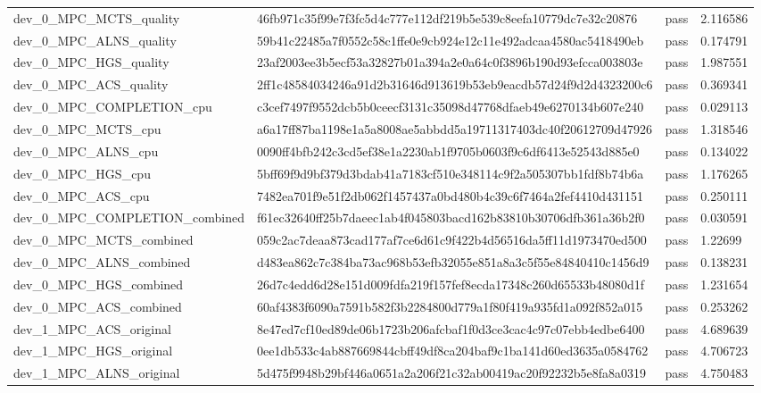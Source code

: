 \begin{tabular}{llll}
dev\_0\_MPC\_MCTS\_quality & 46fb971c35f99e7f3fc5d4c777e112df219b5e539c8eefa10779dc7e32c20876 & pass & 2.116586 \\
dev\_0\_MPC\_ALNS\_quality & 59b41c22485a7f0552c58c1ffe0e9cb924e12c11e492adcaa4580ac5418490eb & pass & 0.174791 \\
dev\_0\_MPC\_HGS\_quality & 23af2003ee3b5ecf53a32827b01a394a2e0a64c0f3896b190d93efcca003803e & pass & 1.987551 \\
dev\_0\_MPC\_ACS\_quality & 2ff1c48584034246a91d2b31646d913619b53eb9eacdb57d24f9d2d4323200c6 & pass & 0.369341 \\
dev\_0\_MPC\_COMPLETION\_cpu & c3cef7497f9552dcb5b0ceecf3131c35098d47768dfaeb49e6270134b607e240 & pass & 0.029113 \\
dev\_0\_MPC\_MCTS\_cpu & a6a17ff87ba1198e1a5a8008ae5abbdd5a19711317403dc40f20612709d47926 & pass & 1.318546 \\
dev\_0\_MPC\_ALNS\_cpu & 0090ff4bfb242c3cd5ef38e1a2230ab1f9705b0603f9c6df6413e52543d885e0 & pass & 0.134022 \\
dev\_0\_MPC\_HGS\_cpu & 5bff69f9d9bf379d3bdab41a7183cf510e348114c9f2a505307bb1fdf8b74b6a & pass & 1.176265 \\
dev\_0\_MPC\_ACS\_cpu & 7482ea701f9e51f2db062f1457437a0bd480b4c39c6f7464a2fef4410d431151 & pass & 0.250111 \\
dev\_0\_MPC\_COMPLETION\_combined & f61ec32640ff25b7daeec1ab4f045803bacd162b83810b30706dfb361a36b2f0 & pass & 0.030591 \\
dev\_0\_MPC\_MCTS\_combined & 059c2ac7deaa873cad177af7ce6d61c9f422b4d56516da5ff11d1973470ed500 & pass & 1.22699 \\
dev\_0\_MPC\_ALNS\_combined & d483ea862c7c384ba73ac968b53efb32055e851a8a3c5f55e84840410c1456d9 & pass & 0.138231 \\
dev\_0\_MPC\_HGS\_combined & 26d7c4edd6d28e151d009fdfa219f157fef8ecda17348c260d65533b48080d1f & pass & 1.231654 \\
dev\_0\_MPC\_ACS\_combined & 60af4383f6090a7591b582f3b2284800d779a1f80f419a935fd1a092f852a015 & pass & 0.253262 \\
dev\_1\_MPC\_ACS\_original & 8e47ed7cf10ed89de06b1723b206afcbaf1f0d3ce3cac4c97c07ebb4edbe6400 & pass & 4.689639 \\
dev\_1\_MPC\_HGS\_original & 0ee1db533c4ab887669844cbff49df8ca204baf9c1ba141d60ed3635a0584762 & pass & 4.706723 \\
dev\_1\_MPC\_ALNS\_original & 5d475f9948b29bf446a0651a2a206f21c32ab00419ac20f92232b5e8fa8a0319 & pass & 4.750483 \\

\end{tabular}
